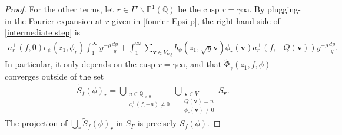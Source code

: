 \documentclass[twoside,a4paper,10pt]{article} %
\newcommand{\8}{\infty}
\newcommand{\vbf}{\mathbf{v}}
\newcommand{\Stil}{\widetilde{S}}
\newcommand{\Q}{\mathbb{Q}}
\newcommand{\PP}{\mathbb{P}}
\newcommand{\reg}{\mathrm{reg}}
\theoremstyle{mytheoremstyle}
\theoremstyle{remark}
\numberwithin{equation}{section}
\begin{document}
\begin{proof}
For the other terms, let $r \in \Gamma' \backslash \PP^1(\Q)$ be the cusp $r=\gamma \8$. By plugging-in the Fourier expansion at $r$ given in \eqref{fourier Epsi p}, the right-hand side of \eqref{intermediate step} is
\begin{align}
a^+_r(f,0)e_\psi(z_1,\phi_r) \int_1^\8 y^{-\rho}\frac{dy}{y} + \int_1^\8\sum_{\vbf \in V_\reg} b_\psi(z_1,\sqrt{y}\vbf) \phi_r(\vbf) a^+_r(f,-Q(\vbf))y^{-\rho}\frac{dy}{y}.
\end{align}
In particular, it only depends on the cusp $r=\gamma \8$, and that $\widetilde{\Phi}_{\gamma}(z_1,f,\phi)$ converges outside of the set
\begin{align}
\Stil_f(\phi)_r = \bigcup_{\substack{ n \in \Q_{>0} \\ a^+_r(f,-n) \neq 0}} \bigcup_{\substack{ \vbf \in  V \\ Q(\vbf)=n \\ \phi_r (\vbf) \neq 0}} S_{\vbf}.
\end{align}
The projection of $\bigcup_r \Stil_f(\phi)_r$ in $S_\Gamma$ is precisely $S_f(\phi)$.
 \end{proof}
\end{document}
